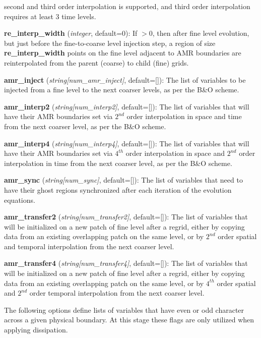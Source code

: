 \documentclass[aps,amssymb,unsortedaddress,nofootinbib]{revtex4}
\def\lsep{\itemsep 0.05in}
\begin{document}
\begin{list}{}{\lsep}
      second and third order interpolation is supported, and third order interpolation requires
      at least 3 time levels.
\item {\bf re\_interp\_width} ({\em integer}, default=0):
      If $>0$, then after fine level evolution, but just before the
      fine-to-coarse level injection step, a region of size {\bf re\_interp\_width}
      points on the fine level adjacent to AMR boundaries are reinterpolated from the parent (coarse)
      to child (fine) grids.
\item {\bf amr\_inject} ({\em string[num\_amr\_inject]}, default=[]):
      The list of variables to be injected from a fine level to the next
      coarser levels, as per the B\&O scheme.
\item {\bf amr\_interp2} ({\em string[num\_interp2]}, default=[]):
      The list of variables that will have their AMR boundaries set
      via $2^{nd}$ order interpolation in space and time from
      the next coarser level, as per the B\&O scheme.
\item {\bf amr\_interp4} ({\em string[num\_interp4]}, default=[]):
      The list of variables that will have their AMR boundaries set
      via $4^{th}$ order interpolation in space and $2^{nd}$ order interpolation in time 
      from the next coarser level, as per the B\&O scheme.
\item {\bf amr\_sync} ({\em string[num\_sync]}, default=[]):
      The list of variables that need to have their ghost regions synchronized
      after each iteration of the evolution equations.
\item {\bf amr\_transfer2} ({\em string[num\_transfer2]}, default=[]):
      The list of variables that will be initialized on a new patch of
      fine level after a regrid, either by copying data from an existing
      overlapping patch on the same level, or by $2^{nd}$ order 
      spatial and temporal interpolation from the next coarser level. 
\item {\bf amr\_transfer4} ({\em string[num\_transfer4]}, default=[]):
      The list of variables that will be initialized on a new patch of
      fine level after a regrid, either by copying data from an existing
      overlapping patch on the same level, or by $4^{th}$ order spatial
      and $2^{nd}$ order temporal interpolation from the next coarser level.
\end{list}

The following options define lists of variables that have even or odd character
across a given physical boundary. At this stage these flags are only utilized
when applying dissipation.
\end{document}
